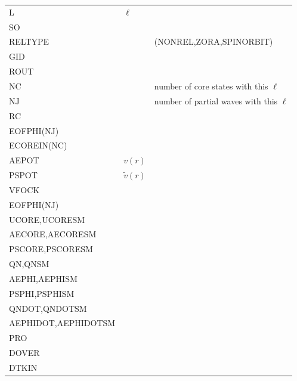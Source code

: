 \documentclass[11pt,a4paper]{report}
\begin{document}
\begin{center}
\begin{tabular}{|l|l|l|}
\hline
L       & $\ell$ & \\
SO      & & \\
\hline
RELTYPE & & (NONREL,ZORA,SPINORBIT)\\
GID     & & \\
ROUT    & & \\
NC      & & number of core states  with this $\ell$\\
NJ      & & number of partial waves with this $\ell$\\
RC      & & \\ 
EOFPHI(NJ) & & \\
ECOREIN(NC)& & \\
AEPOT      & $v(r)$ & \\
PSPOT      & $\tilde{v}(r)$ & \\
VFOCK      & & \\
\hline
EOFPHI(NJ)      & & \\
UCORE,UCORESM   & & \\
AECORE,AECORESM & & \\
PSCORE,PSCORESM & & \\
QN,QNSM         & & \\
AEPHI,AEPHISM   & & \\
PSPHI,PSPHISM   & & \\
QNDOT,QNDOTSM   & & \\
AEPHIDOT,AEPHIDOTSM & & \\
PRO             & & \\
DOVER           & & \\
DTKIN           & & \\
\hline
\end{tabular}
\end{center}
\end{document}
